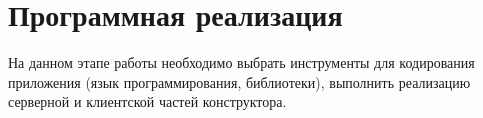 
\newpage

\section{Программная реализация}

На данном этапе работы необходимо выбрать инструменты для
кодирования приложения (язык программирования, библиотеки), выполнить
реализацию серверной и клиентской частей конструктора.




